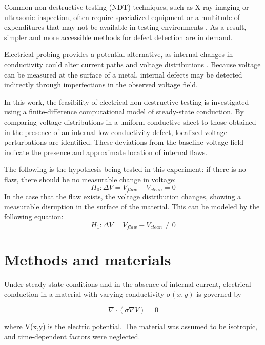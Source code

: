 \documentclass[reprint,amsmath,amssymb,aps]{revtex4-2}
\begin{document}
Common non-destructive testing (NDT) techniques, such as X-ray imaging or ultrasonic inspection, often require specialized equipment or a multitude of expenditures that may not be available in testing environments \cite{2}. As a result, simpler and more accessible methods for defect detection are in demand.

Electrical probing provides a potential alternative, as internal changes in conductivity could alter current paths and voltage distributions \cite{3}. Because voltage can be measured at the surface of a metal, internal defects may be detected indirectly through imperfections in the observed voltage field.

In this work, the feasibility of electrical non-destructive testing is investigated using a finite-difference computational model of steady-state conduction. By comparing voltage distributions in a uniform conductive sheet to those obtained in the presence of an internal low-conductivity defect, localized voltage perturbations are identified. These deviations from the baseline voltage field indicate the presence and approximate location of internal flaws.

The following is the hypothesis being tested in this experiment: if there is no flaw, there should be no measurable change in voltage:
\begin{equation} 
    H_0: \Delta V = V_{flaw} - V_{clean} = 0
\end{equation}
In the case that the flaw exists, the voltage distribution changes, showing a measurable disruption in the surface of the material. This can be modeled by the following equation:
\begin{equation}
    H_1: \Delta V = V_{flaw} - V_{clean} \neq 0
\end{equation}

\section{Methods and materials}

Under steady-state conditions and in the absence of internal current, electrical conduction in a material with varying conductivity $\sigma(x,y)$ is governed by

\begin{equation}
    \nabla \cdot (\sigma \nabla V) = 0
\end{equation} \label{conductivity equation}

where V(x,y) is the electric potential. The material was assumed to be isotropic, and time-dependent factors were neglected.
\end{document}
